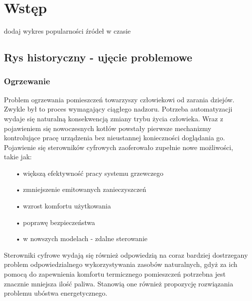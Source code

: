\documentclass[11pt]{report}
\begin{document}
 \begin{titlepage}
 \vspace{0.1\textheight}
 \bigskip
 \vspace{0.3\textheight}
 \par

 \vspace{0.1\textheight}
 \end{titlepage}


 \tableofcontents


 \chapter{Wstęp}
dodaj wykres popularności źródeł w czasie
 \section{Rys historyczny - ujęcie problemowe}
 \subsection{Ogrzewanie}
 Problem ogrzewania pomieszczeń towarzyszy człowiekowi od zarania dziejów. Zwykle był to proces wymagający ciągłego nadzoru. Potrzeba automatyzacji wydaje się naturalną konsekwencją zmiany trybu życia człowieka. Wraz z pojawieniem się nowoczesnych kotłów powstały pierwsze mechanizmy kontrolujące pracę urządzenia bez nieustannej konieczności doglądania go.
 Pojawienie się sterowników cyfrowych zaoferowało zupełnie nowe możliwości, takie jak:
  \begin{enumerate}
 \item[•] większą efektywność pracy systemu grzewczego
 \item[•] zmniejszenie emitowanych zanieczyszczeń
 \item[•] wzrost komfortu użytkowania
 \item[•] poprawę bezpieczeństwa
 \item[•] w nowszych modelach - zdalne sterowanie
  \end{enumerate}
 Sterowniki cyfrowe wydają się również odpowiedzią na coraz bardziej dostrzegany problem odpowiedzialnego wykorzystywania zasobów naturalnych, gdyż za ich pomocą do zapewnienia komfortu termicznego pomieszczeń potrzebna jest znacznie mniejsza ilość paliwa. Stanowią one również propozycję rozwiązania problemu ubóstwa energetycznego.
\end{document}
